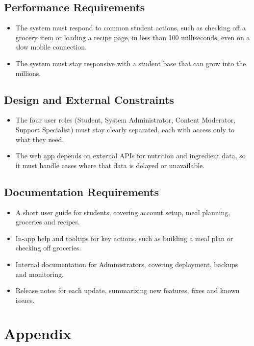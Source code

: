 \documentclass[10pt,letterpaper]{article}
\begin{document}
\subsection{Performance Requirements}
\begin{itemize}[leftmargin=1.5em]
  \item The system must respond to common student actions, such as checking off a grocery item or loading a recipe page, in less than 100 milliseconds, even on a slow mobile connection.
  \item The system must stay responsive with a student base that can grow into the millions.
\end{itemize}

\subsection{Design and External Constraints}
\begin{itemize}[leftmargin=1.5em]
  \item The four user roles (Student, System Administrator, Content Moderator, Support Specialist) must stay clearly separated, each with access only to what they need.
  \item The web app depends on external APIs for nutrition and ingredient data, so it must handle cases where that data is delayed or unavailable.
\end{itemize}

\subsection{Documentation Requirements}
\begin{itemize}[leftmargin=1.5em]
  \item A short user guide for students, covering account setup, meal planning, groceries and recipes.
  \item In-app help and tooltips for key actions, such as building a meal plan or checking off groceries.
  \item Internal documentation for Administrators, covering deployment, backups and monitoring.
  \item Release notes for each update, summarizing new features, fixes and known issues.
\end{itemize}

\section{Appendix}
\end{document}
